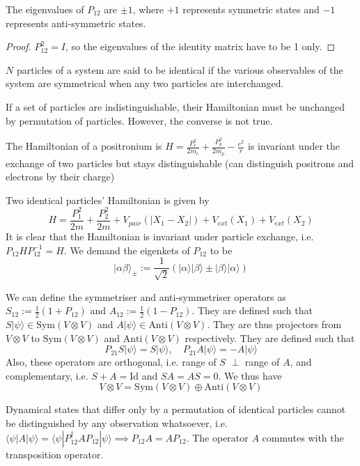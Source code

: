 \documentclass[a4paper]{article}
\begin{document}
\begin{thm}
The eigenvalues of $P_{12}$ are $\pm1$, where $+1$ represents symmetric states and $-1$ represents anti-symmetric states.
\end{thm}
\begin{proof}
$P_{12}^2=I$, so the eigenvalues of the identity matrix have to be 1 only.
\end{proof}
\begin{defi}[Identical]
$N$ particles of a system are said to be identical if the various observables of the system are symmetrical when any two particles are interchanged.
\end{defi}
\begin{thm}
If a set of particles are indistinguishable, their Hamiltonian must be unchanged by permutation of particles. However, the converse is not true.
\end{thm}
\begin{eg}
The Hamiltonian of a positronium is $H=\frac{P_e^2}{2m_e}+\frac{P_p^2}{2m_p}-\frac{e^2}{r}$ is invariant under the exchange of two particles but stays distinguishable (can distinguish positrons and electrons by their charge)
\end{eg}
\begin{eg}
Two identical particles' Hamiltonian is given by
$$H=\frac{P_1^2}{2m}+\frac{P_2^2}{2m}+V_{pair}(|X_1-X_2|)+V_{ext}(X_1)+V_{ext}(X_2)$$
It is clear that the Hamiltonian is invariant under particle exchange, i.e. $P_{12}HP_{12}^{-1}=H$. We demand the eigenkets of $P_{12}$ to be
$$|\alpha\beta\rangle_{\pm}:=\frac{1}{\sqrt{2}}(|\alpha\rangle|\beta\rangle\pm|\beta\rangle|\alpha\rangle)$$
\end{eg}
\begin{defi}
We can define the symmetriser and anti-symmetriser operators as $S_{12}:=\frac{1}{2}(1+P_{12})$ and $A_{12}:=\frac{1}{2}(1-P_{12})$. They are defined such that $S|\psi\rangle\in\text{Sym}(V\otimes V)$ and $A|\psi\rangle\in\text{Anti}(V\otimes V)$. They are thus projectors from $V\otimes V$ to $\text{Sym}(V\otimes V)$ and $\text{Anti}(V\otimes V)$ respectively. They are defined such that
$$P_{21}S|\psi\rangle=S|\psi\rangle,\quad P_{21}A|\psi\rangle=-A|\psi\rangle$$
Also, these operators are orthogonal, i.e. range of $S$ $\perp$ range of $A$, and complementary, i.e. $S+A=\text{Id}$ and $SA=AS=0$. We thus have
$$V\otimes V=\text{Sym}(V\otimes V)\oplus\text{Anti}(V\otimes V)$$
\end{defi}
\begin{defi}
Dynamical states that differ only by a permutation of
identical particles cannot be distinguished by any observation whatsoever, i.e. $\langle\psi|A|\psi\rangle=\langle\psi|P_{12}^\dag AP_{12}|\psi\rangle\implies P_{12}A=AP_{12}$. The operator $A$ commutes with the transposition operator.
\end{defi}
\end{document}
